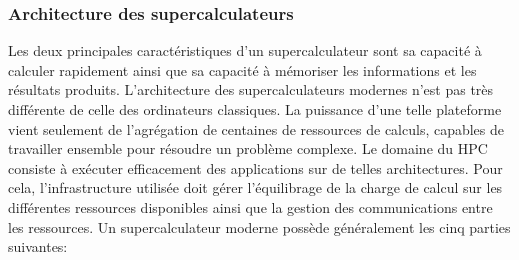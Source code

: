         
    
        
    \subsubsection{Architecture des supercalculateurs}
    
        Les deux principales caractéristiques d'un supercalculateur sont sa capacité à calculer rapidement ainsi que sa capacité à mémoriser les informations et les résultats produits. L'architecture des supercalculateurs modernes n'est pas très différente de celle des ordinateurs classiques. La puissance d'une telle plateforme vient seulement de l'agrégation de centaines de ressources de calculs, capables de travailler ensemble pour résoudre un problème complexe. Le domaine du HPC consiste à exécuter efficacement des applications sur de telles architectures. Pour cela, l'infrastructure utilisée doit gérer l'équilibrage de la charge de calcul sur les différentes ressources disponibles ainsi que la gestion des communications entre les ressources. Un supercalculateur moderne possède généralement les cinq parties suivantes:
      
